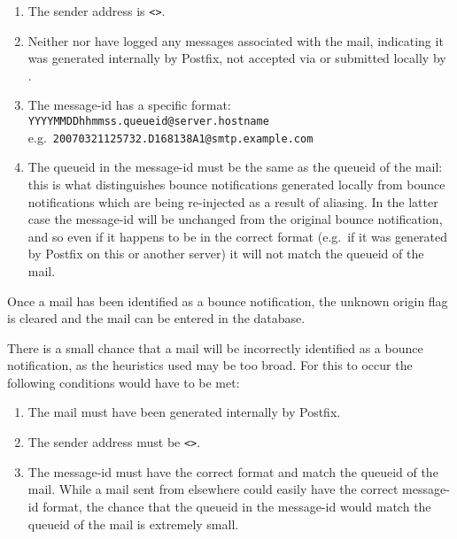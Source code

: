 \begin{enumerate}

    \item The sender address is \verb!<>!.\glsadd{<>}

    \item Neither  nor  have logged any
        messages associated with the mail, indicating it was generated
        internally by Postfix, not accepted via  or submitted
        locally by .

    \item The message-id has a specific format: \newline{}
        \tab{} \texttt{YYYYMMDDhhmmss.queueid@server.hostname} \newline{}
        e.g.\ \texttt{20070321125732.D168138A1@smtp.example.com}

    \item The queueid in the message-id must be the same as the queueid of
        the mail: this is what distinguishes bounce notifications generated
        locally from bounce notifications which are being re-injected as a
        result of aliasing.  In the latter case the message-id will be
        unchanged from the original bounce notification, and so even if it
        happens to be in the correct format (e.g.\ if it was generated by
        Postfix on this or another server) it will not match the queueid of
        the mail.

\end{enumerate}

Once a mail has been identified as a bounce notification, the unknown
origin flag is cleared and the mail can be entered in the database.

There is a small chance that a mail will be incorrectly identified as a
bounce notification, as the heuristics used may be too broad.  For this to
occur the following conditions would have to be met:

\begin{enumerate}

    \item The mail must have been generated internally by Postfix.

    \item The sender address must be \verb!<>!.\glsadd{<>}

    \item The message-id must have the correct format and match the queueid
        of the mail.  While a mail sent from elsewhere could easily have
        the correct message-id format, the chance that the queueid in the
        message-id would match the queueid of the mail is extremely small.

\end{enumerate}

